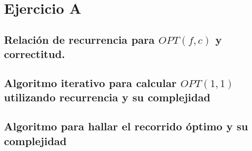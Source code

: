 \section{Ejercicio A}

\subsection{ Relación de recurrencia para $OPT(f, c)$ y correctitud.}



\subsection{Algoritmo iterativo para calcular $OPT(1, 1)$ utilizando recurrencia y su complejidad}




\subsection{Algoritmo para hallar el recorrido óptimo y su complejidad}







\newpage